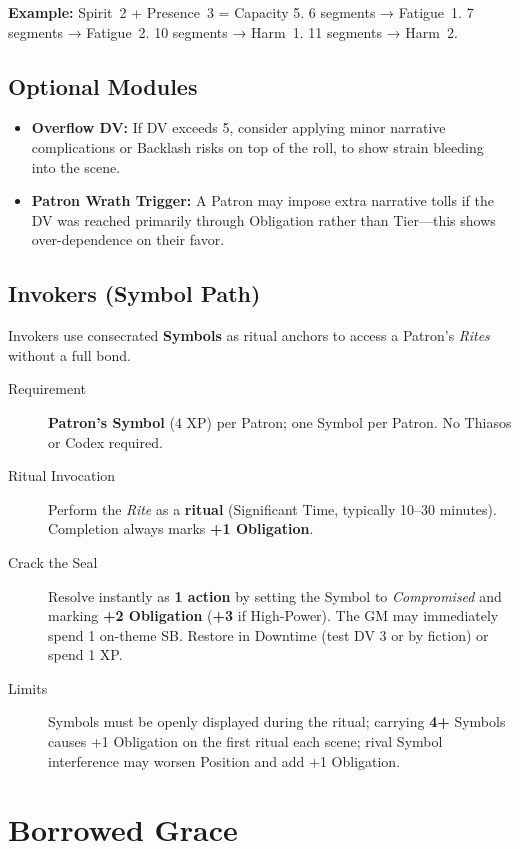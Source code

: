 \textbf{Example:} Spirit~2 + Presence~3 = Capacity 5.
6 segments → Fatigue~1.
7 segments → Fatigue~2.
10 segments → Harm~1.
11 segments → Harm~2.

\subsection*{Optional Modules}

\begin{itemize}
  \item \textbf{Overflow DV:} If DV exceeds 5, consider applying minor narrative complications or Backlash risks on top of the roll, to show strain bleeding into the scene.
  \item \textbf{Patron Wrath Trigger:} A Patron may impose extra narrative tolls if the DV was reached primarily through Obligation rather than Tier—this shows over-dependence on their favor.
\end{itemize}

\subsection{Invokers (Symbol Path)}
\label{subsec:invokers}

Invokers use consecrated \textbf{Symbols} as ritual anchors to access a Patron's \emph{Rites} without a full bond.

\begin{description}
\item[Requirement] \textbf{Patron's Symbol} (4 XP) per Patron; one Symbol per Patron. No Thiasos or Codex required.
\item[Ritual Invocation] Perform the \emph{Rite} as a \textbf{ritual} (Significant Time, typically 10–30 minutes). Completion always marks \textbf{+1 Obligation}.
\item[Crack the Seal] Resolve instantly as \textbf{1 action} by setting the Symbol to \emph{Compromised} and marking \textbf{+2 Obligation} (\textbf{+3} if High-Power). The GM may immediately spend 1 on-theme SB. Restore in Downtime (test DV 3 or by fiction) or spend 1 XP.
\item[Limits] Symbols must be openly displayed during the ritual; carrying \textbf{4+} Symbols causes +1 Obligation on the first ritual each scene; rival Symbol interference may worsen Position and add +1 Obligation.
\end{description}

\section*{Borrowed Grace}
\label{talent:borrowed-grace}

